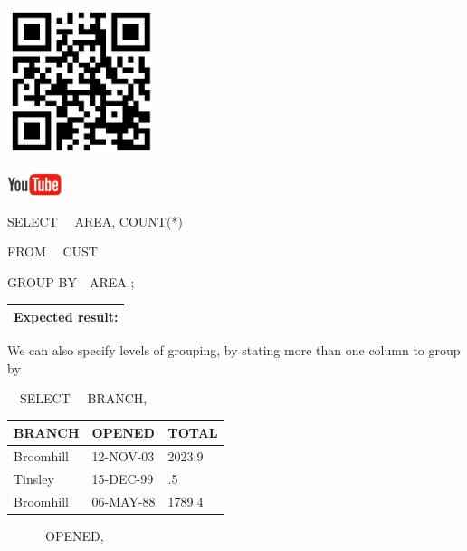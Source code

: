 \begin{center}
\begin{minipage}{4.849cm}
   
\includegraphics[width=4.341cm,height=4.341cm]{images/img (34).png}
 

   
\includegraphics[width=1.582cm,height=0.674cm]{images/img (15).png}
 
\end{minipage}
\end{center}
SELECT \ \ AREA, COUNT(*)

FROM \ \ CUST

GROUP BY\ \ AREA ;

\begin{flushleft}
\tablefirsthead{}
\tablehead{}
\tabletail{}
\tablelasttail{}
\begin{supertabular}{|m{10.445001cm}|}
\hline
Expected result:

\\\hline
\end{supertabular}
\end{flushleft}
We can also specify levels of grouping, by stating more than one column to group by

\ \ SELECT \ \ BRANCH,

\begin{center}
\begin{minipage}{7.003cm}
\begin{flushleft}
\tablefirsthead{}
\tablehead{}
\tabletail{}
\tablelasttail{}
\begin{supertabular}{|m{2.2389998cm}|m{2.55cm}|m{1.6129999cm}|}
\hline
BRANCH &
OPENED &
TOTAL\\\hline
Broomhill &
12-NOV-03 &
2023.9\\\hline
Tinsley &
15-DEC-99 &
.5\\\hline
Broomhill &
06-MAY-88 &
1789.4\\
\end{supertabular}
\end{flushleft}
\end{minipage}
\end{center}
\ \ \ \ \ \ OPENED,


